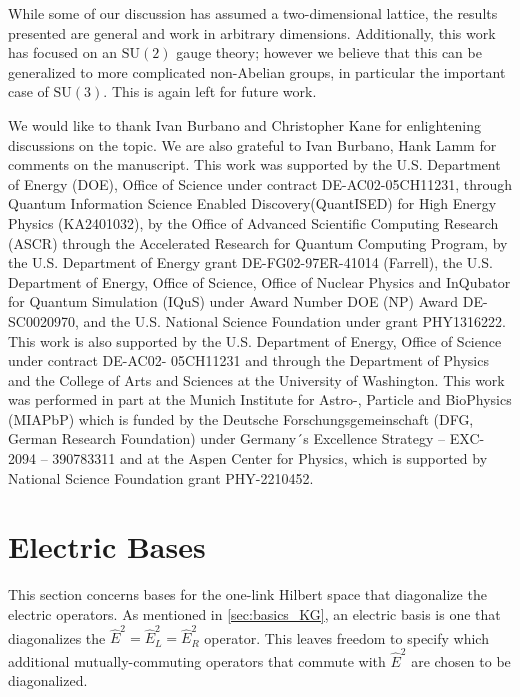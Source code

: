 \documentclass[reprint,superscriptaddress,pra,nofootinbib,preprintnumbers,floatfix]{revtex4-1}
\providecommand{\sutwo}{$\mathrm{SU}(2)$\xspace}
\providecommand{\suthree}{$\mathrm{SU}(3)$\xspace}
\begin{document}
While some of our discussion has assumed a two-dimensional lattice, the results presented are general and work in arbitrary dimensions.
%
Additionally, this work has focused on an \sutwo gauge theory; however we believe that this can be generalized to more complicated non-Abelian groups, in particular the important case of \suthree. This is again left for future work. 

\begin{acknowledgments}
We would like to thank Ivan Burbano and Christopher Kane for enlightening discussions on the topic.
%
We are also grateful to Ivan Burbano, Hank Lamm for comments on the manuscript.
%
This work was supported by the U.S. Department of Energy (DOE), Office of Science under contract DE-AC02-05CH11231, through Quantum Information Science Enabled Discovery(QuantISED) for High Energy Physics (KA2401032), by the Office of Advanced Scientific Computing Research (ASCR) through the Accelerated Research for Quantum Computing Program, by the U.S. Department of Energy grant DE-FG02-97ER-41014 (Farrell), the U.S. Department of Energy, Office of Science, Office of Nuclear Physics and \href{https://iqus.uw.edu}{\color{black}}{InQubator for Quantum Simulation (IQuS)} under Award Number DOE (NP) Award DE-SC0020970, and the U.S. National Science Foundation under grant PHY1316222. This work is also supported by the U.S. Department of Energy, Office of Science under contract DE-AC02- 05CH11231 and through the \href{https://phys.washington.edu}{\color{black}}{Department of Physics} and \href{https://www.artsci.washington. edu}{\color{black}}{the College of Arts and Sciences}  at the University of Washington. This work was performed in part at the Munich Institute for Astro-, Particle and BioPhysics (MIAPbP) which is funded by the Deutsche Forschungsgemeinschaft (DFG, German Research Foundation) under Germany´s Excellence Strategy – EXC-2094 – 390783311 and at the Aspen Center for Physics, which is supported by National Science Foundation grant PHY-2210452.
\end{acknowledgments}



\appendix

\section{Electric Bases}\label{app:elec_bases}
This section concerns bases for the one-link Hilbert space that diagonalize the electric operators. As mentioned in \cref{sec:basics_KG}, an electric basis is one that diagonalizes the $\hat E^2 = \hat E_L^2 = \hat E_R^2$ operator.
%
This leaves freedom to specify which additional mutually-commuting operators that commute with $\hat E^2$ are chosen to be diagonalized.
\end{document}
